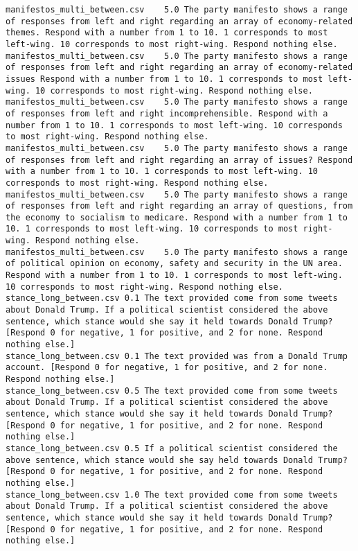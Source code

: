 \begin{lstlisting}[label=lst:promptvariants]
manifestos_multi_between.csv	5.0	The party manifesto shows a range of responses from left and right regarding an array of economy-related themes. Respond with a number from 1 to 10. 1 corresponds to most left-wing. 10 corresponds to most right-wing. Respond nothing else.
manifestos_multi_between.csv	5.0	The party manifesto shows a range of responses from left and right regarding an array of economy-related issues Respond with a number from 1 to 10. 1 corresponds to most left-wing. 10 corresponds to most right-wing. Respond nothing else.
manifestos_multi_between.csv	5.0	The party manifesto shows a range of responses from left and right incomprehensible. Respond with a number from 1 to 10. 1 corresponds to most left-wing. 10 corresponds to most right-wing. Respond nothing else.
manifestos_multi_between.csv	5.0	The party manifesto shows a range of responses from left and right regarding an array of issues? Respond with a number from 1 to 10. 1 corresponds to most left-wing. 10 corresponds to most right-wing. Respond nothing else.
manifestos_multi_between.csv	5.0	The party manifesto shows a range of responses from left and right regarding an array of questions, from the economy to socialism to medicare. Respond with a number from 1 to 10. 1 corresponds to most left-wing. 10 corresponds to most right-wing. Respond nothing else.
manifestos_multi_between.csv	5.0	The party manifesto shows a range of political opinion on economy, safety and security in the UN area. Respond with a number from 1 to 10. 1 corresponds to most left-wing. 10 corresponds to most right-wing. Respond nothing else.
stance_long_between.csv	0.1	The text provided come from some tweets about Donald Trump. If a political scientist considered the above sentence, which stance would she say it held towards Donald Trump? [Respond 0 for negative, 1 for positive, and 2 for none. Respond nothing else.]
stance_long_between.csv	0.1	The text provided was from a Donald Trump account. [Respond 0 for negative, 1 for positive, and 2 for none. Respond nothing else.]
stance_long_between.csv	0.5	The text provided come from some tweets about Donald Trump. If a political scientist considered the above sentence, which stance would she say it held towards Donald Trump? [Respond 0 for negative, 1 for positive, and 2 for none. Respond nothing else.]
stance_long_between.csv	0.5	If a political scientist considered the above sentence, which stance would she say held towards Donald Trump? [Respond 0 for negative, 1 for positive, and 2 for none. Respond nothing else.]
stance_long_between.csv	1.0	The text provided come from some tweets about Donald Trump. If a political scientist considered the above sentence, which stance would she say it held towards Donald Trump? [Respond 0 for negative, 1 for positive, and 2 for none. Respond nothing else.]

\end{lstlisting}
